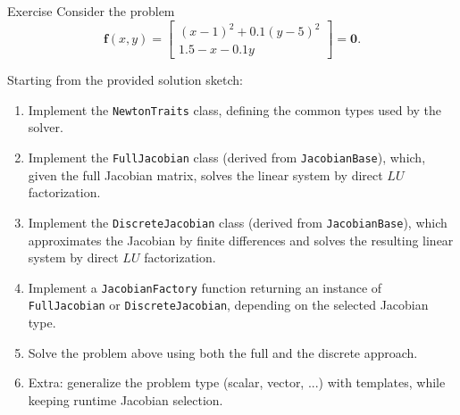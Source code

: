 \documentclass[10pt]{beamer}
\begin{document}
\begin{frame}{Exercise}
	Consider the problem
	\[
	\mathbf{f}(x, y) =
	\begin{bmatrix}
		(x-1)^2 + 0.1(y - 5)^2 \\
		1.5 -x - 0.1y
	\end{bmatrix}
	=
	\mathbf{0}.
	\]
	
	Starting from the provided solution sketch:
	\begin{enumerate}\small
		\item Implement the \texttt{NewtonTraits} class, defining the common types used by the solver.
		\item Implement the \texttt{FullJacobian} class (derived from \texttt{JacobianBase}), which, given the full Jacobian matrix, solves the linear system by direct \(LU\) factorization.
		\item Implement the \texttt{DiscreteJacobian} class (derived from \texttt{JacobianBase}), which approximates the Jacobian by finite differences and solves the resulting linear system by direct \(LU\) factorization.
		\item Implement a \texttt{JacobianFactory} function returning an instance of \texttt{FullJacobian} or \texttt{DiscreteJacobian}, depending on the selected Jacobian type.
		\item Solve the problem above using both the full and the discrete approach.
		\item Extra: generalize the problem type (scalar, vector, ...) with templates, while keeping runtime Jacobian selection.
	\end{enumerate}
\end{frame}
\end{document}
